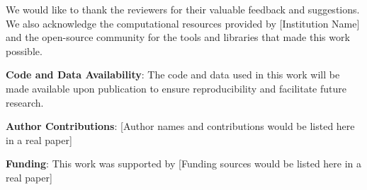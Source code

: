 We would like to thank the reviewers for their valuable feedback and suggestions. We also acknowledge the computational resources provided by [Institution Name] and the open-source community for the tools and libraries that made this work possible.

\noindent\textbf{Code and Data Availability}: The code and data used in this work will be made available upon publication to ensure reproducibility and facilitate future research.

\noindent\textbf{Author Contributions}: [Author names and contributions would be listed here in a real paper]

\noindent\textbf{Funding}: This work was supported by [Funding sources would be listed here in a real paper]
